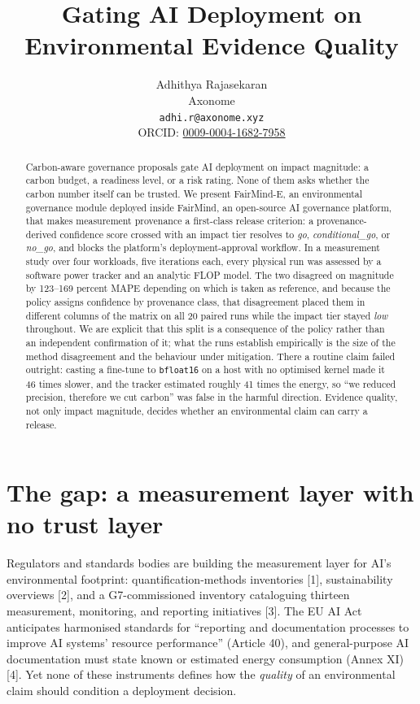 \documentclass{article}
\title{Gating AI Deployment on Environmental Evidence Quality}
\author{%
  Adhithya Rajasekaran\\
  Axonome\\
  \texttt{adhi.r@axonome.xyz}\\
  ORCID: \href{https://orcid.org/0009-0004-1682-7958}{0009-0004-1682-7958}
}
\newcommand{\sysname}{FairMind-E}
\newcommand{\platname}{FairMind, an open-source AI governance platform}
\begin{document}
\maketitle

\begin{abstract}
Carbon-aware governance proposals gate AI deployment on impact magnitude: a
carbon budget, a readiness level, or a risk rating. None of them asks whether
the carbon number itself can be trusted. We present \sysname, an environmental
governance module deployed inside \platname, that makes measurement provenance
a first-class release criterion: a provenance-derived confidence score crossed
with an impact tier resolves to \emph{go}, \emph{conditional\_go}, or
\emph{no\_go}, and blocks the platform's deployment-approval workflow. In a
measurement study over four workloads, five iterations each, every physical run
was assessed by a software power tracker and an analytic FLOP model. The two
disagreed on magnitude by 123--169 percent MAPE depending on which is taken as
reference, and because the policy assigns confidence by provenance class, that
disagreement placed them in different columns of the matrix on all 20 paired
runs while the impact tier stayed \emph{low} throughout. We are explicit that
this split is a consequence of the policy rather than an independent
confirmation of it; what the runs establish empirically is the size of the
method disagreement and the behaviour under mitigation. There a routine claim
failed outright: casting a fine-tune to \texttt{bfloat16} on a host with no
optimised kernel made it 46 times slower, and the tracker estimated roughly 41
times the energy, so ``we reduced precision, therefore we cut carbon'' was
false in the harmful direction. Evidence quality,
not only impact magnitude, decides whether an environmental claim can carry a
release.
\end{abstract}

\section{The gap: a measurement layer with no trust layer}

Regulators and standards bodies are building the measurement layer for AI's
environmental footprint: quantification-methods inventories [1],
sustainability overviews [2], and a G7-commissioned inventory cataloguing
thirteen measurement, monitoring, and reporting initiatives [3]. The EU AI Act
anticipates harmonised standards for ``reporting and documentation processes
to improve AI systems' resource performance'' (Article 40), and
general-purpose AI documentation must state known or estimated energy
consumption (Annex XI) [4]. Yet none of these instruments defines how the
\emph{quality} of an environmental claim should condition a deployment
decision.
\end{document}
